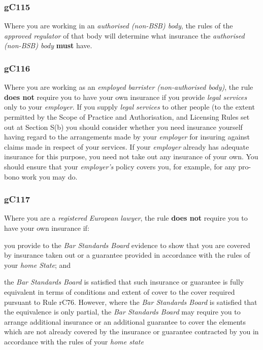 \subsubsection{\color{darkgrey}gC115}

Where you are working in an \emph{authorised (non-BSB) body}, the rules
of the \emph{approved regulator} of that body will determine what
insurance the \emph{authorised (non-BSB) body} \textcolor{myred}{\textbf{must}} have.

\subsubsection{\color{darkgrey}gC116}

Where you are working as an \emph{employed barrister (non-authorised
body)}, the rule \textcolor{myred}{\textbf{does not}} require you to have your own insurance if you
provide \emph{legal services} only to your \emph{employer}. If you
supply \emph{legal services} to other people (to the extent permitted by
the Scope of Practice and Authorisation, and Licensing Rules set out at
Section S(b) you should consider whether you need insurance yourself
having regard to the arrangements made by your \emph{employer} for
insuring against claims made in respect of your services. If your
\emph{employer} already has adequate insurance for this purpose, you
need not take out any insurance of your own. You should ensure that your
\emph{employer's} policy covers you, for example, for any pro-bono work
you may do.

\subsubsection{\color{darkgrey}gC117}

Where you are a \emph{registered European lawyer}, the rule \textcolor{myred}{\textbf{does not}}
require you to have your own insurance if:
\begin{numlist}\item you provide to the \emph{Bar Standards Board} evidence to show that
you are covered by insurance taken out or a guarantee provided in
accordance with the rules of your \emph{home State}; and
\item the \emph{Bar Standards Board} is satisfied that such insurance or
guarantee is fully equivalent in terms of conditions and extent of cover
to the cover required pursuant to Rule rC76. However, where the
\emph{Bar Standards Board} is satisfied that the equivalence is only
partial, the \emph{Bar Standards Board} may require you to arrange
additional insurance or an additional guarantee to cover the elements
which are not already covered by the insurance or guarantee contracted
by you in accordance with the rules of your \emph{home state}
\end{numlist}



